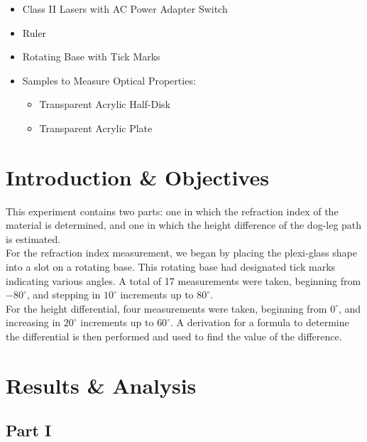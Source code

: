 \documentclass[
	letterpaper, %
	10pt, %
]{CSUniSchoolLabReport}
\begin{document}
\begin{itemize}

  \item Class II Lasers with AC Power Adapter Switch

  \item Ruler

  \item Rotating Base with Tick Marks

  \item Samples to Measure Optical Properties:

    \begin{itemize}

      \item Transparent Acrylic Half-Disk

      \item Transparent Acrylic Plate

    \end{itemize}

\end{itemize}

\section{Introduction \& Objectives}

This experiment contains two parts: one in which the refraction index of the material is determined, and one in which the height difference of the dog-leg path is estimated.\\

For the refraction index measurement, we began by placing the plexi-glass shape into a slot on a rotating base. This rotating base had designated tick marks indicating various angles. A total of 17 measurements were taken, beginning from $-80^{\circ}$, and stepping in $10^{\circ}$ increments up to $80^{\circ}$.\\

For the height differential, four measurements were taken, beginning from $0^{\circ}$, and increasing in $20^{\circ}$ increments up to $60^{\circ}$. A derivation for a formula to determine the differential is then performed and used to find the value of the difference.

\section{Results \& Analysis} 

\subsection{Part I}
\end{document}
